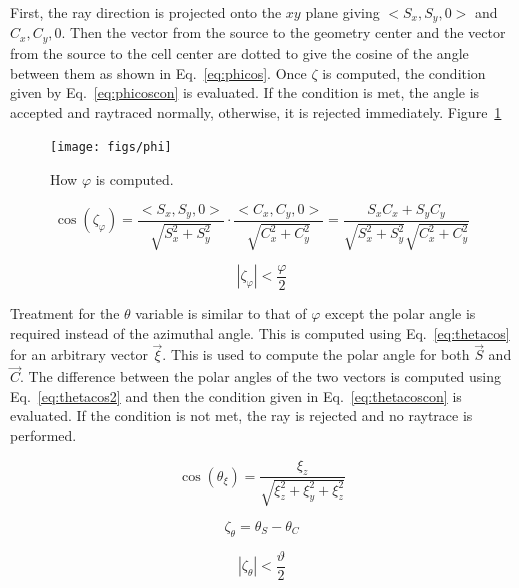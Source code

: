 First, the ray direction is projected onto the $xy$ plane giving $<S_x, S_y, 0>$ and $C_x, C_y, 0$. Then the vector from the source to the geometry center and the vector from the source to the cell center are dotted to give the cosine of the angle between them as shown in Eq.~\ref{eq:phicos}. Once $\zeta$ is computed, the condition given by Eq.~\ref{eq:phicoscon} is evaluated. If the condition is met, the angle is accepted and raytraced normally, otherwise, it is rejected immediately. Figure~\ref{fig:phi}

\begin{figure}[tb]
  \begin{center}
   \texttt{[image: figs/phi]}
  \end{center}
  \caption{How $\varphi$ is computed.}
\label{fig:phi}
\end{figure}

\begin{equation}\label{eq:phicos}
\cos(\zeta_\varphi) = \frac{<S_x, S_y, 0>}{\sqrt{S_x^2 + S_y^2}} \cdot \frac{<C_x, C_y, 0>}{\sqrt{C_x^2 + C_y^2}} = \frac{S_x C_x + S_y C_y}{\sqrt{S_x^2 + S_y^2} \sqrt{C_x^2 + C_y^2}}
\end{equation}

\begin{equation}\label{eq:phicoscon}
|\zeta_\varphi| < \frac{\varphi}{2}
\end{equation}

Treatment for the $\theta$ variable is similar to that of $\varphi$ except the polar angle is required instead of the azimuthal angle. This is computed using Eq.~\ref{eq:thetacos} for an arbitrary vector $\vec{\xi}$. This is used to compute the polar angle for both $\vec{S}$ and $\vec{C}$. The difference between the polar angles of the two vectors is computed using Eq.~\ref{eq:thetacos2} and then the condition given in Eq.~\ref{eq:thetacoscon} is evaluated. If the condition is not met, the ray is rejected and no raytrace is performed.

\begin{equation}\label{eq:thetacos}
\cos(\theta_\xi) = \frac{\xi_z}{\sqrt{\xi_z^2 + \xi_y^2 + \xi_z^2}}
\end{equation}

\begin{equation}\label{eq:thetacos2}
\zeta_\theta = \theta_S - \theta_C
\end{equation}

\begin{equation}\label{eq:thetacoscon}
|\zeta_\theta| < \frac{\vartheta}{2}
\end{equation}


